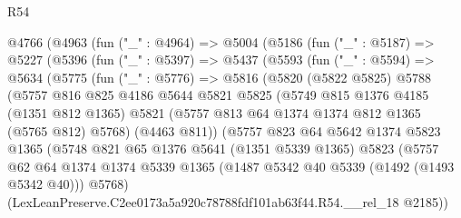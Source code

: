 \begin{lexlean}{R54}
\begin{coremodule}
          @4766
            (@4963
              (fun ("_" : @4964) =>
              @5004
                (@5186
                  (fun ("_" : @5187) =>
                  @5227
                    (@5396
                      (fun ("_" : @5397) =>
                      @5437
                        (@5593
                          (fun ("_" : @5594) =>
                          @5634
                            (@5775
                              (fun ("_" : @5776) =>
                              @5816
                                (@5820
                                  (@5822 @5825)
                                  @5788
                                  (@5757
                                    @816
                                    @825
                                    @4186
                                    @5644
                                    @5821
                                    @5825
                                    (@5749
                                      @815
                                      @1376
                                      @4185
                                      (@1351 @812 @1365)
                                      @5821
                                      (@5757 @813 @64 @1374 @1374 @812 @1365 (@5765 @812) @5768)
                                      (@4463 @811))
                                    (@5757
                                      @823
                                      @64
                                      @5642
                                      @1374
                                      @5823
                                      @1365
                                      (@5748
                                        @821
                                        @65
                                        @1376
                                        @5641
                                        (@1351 @5339 @1365)
                                        @5823
                                        (@5757
                                          @62
                                          @64
                                          @1374
                                          @1374
                                          @5339
                                          @1365
                                          (@1487 @5342 @40 @5339 (@1492 (@1493 @5342 @40)))
                                          @5768)
                                        (LexLeanPreserve.C2ee0173a5a920c78788fdf101ab63f44.R54.__rel_18
                                          @2185))

\end{coremodule}
\end{lexlean}
